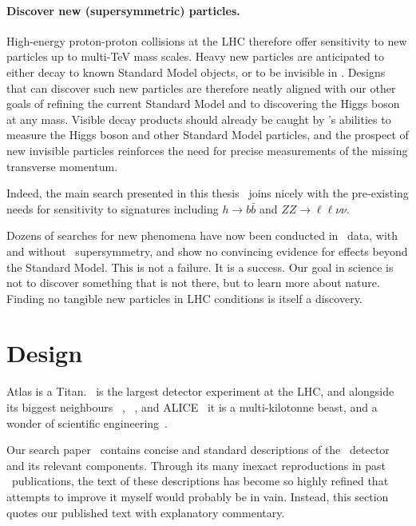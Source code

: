 \paragraph{Discover new (supersymmetric) particles.}
High-energy proton-proton collisions at the LHC therefore offer sensitivity
to new particles up to multi-TeV mass scales.
Heavy new particles are anticipated to either decay to known Standard Model
objects, or to be invisible in \atlas.
Designs that can discover such new particles are therefore neatly aligned with
our other goals of refining the current Standard Model
and to discovering the Higgs boson at any mass.
Visible decay products should already be caught by \atlas's abilities
to measure the Higgs boson and other Standard Model particles,
and the prospect of new invisible particles reinforces the need for precise
measurements of the missing transverse momentum.

Indeed, the main search presented in this thesis~\cite{atlas2022searches}
joins nicely with the pre-existing needs for sensitivity to signatures
including
$h \to b\bar b$
and
$ZZ \to \ell\ell\nu\nu$.

Dozens of searches for new phenomena have now been conducted in \atlas\ data,
with~\cite{
ATL-PHYS-PUB-2022-013
}
and without~\cite{
ATL-PHYS-PUB-2022-007,
ATL-PHYS-PUB-2022-012,
ATL-PHYS-PUB-2022-036,
ATL-PHYS-PUB-2022-034
} supersymmetry,
and show no convincing evidence for effects beyond the Standard Model.
This is not a failure. It is a success.
Our goal in science is not to discover something that is not there,
but to learn more about nature.
Finding no tangible new particles in LHC conditions is itself a discovery.


\section{Design}
Atlas is a Titan.
\atlas\ is the largest detector experiment at the LHC,
and alongside its biggest neighbours
\cms~\cite{cms2008experiment},
\lhcb~\cite{lhcb2008experiment},
and ALICE~\cite{alice2008experiment}
it is a multi-kilotonne beast,
and a wonder of scientific engineering~\cite{
atlas1994proposal,
atlas2008experiment,
atlas1999design1,
atlas1999design2
}.

Our search paper~\cite{atlas2022searches} contains concise and standard
descriptions of the \atlas\ detector and its relevant components.
Through its many inexact reproductions in past \atlas\ publications, the text
of these descriptions has become so highly refined that attempts to improve
it myself would probably be in vain.
Instead, this section quotes our published text with explanatory commentary.

